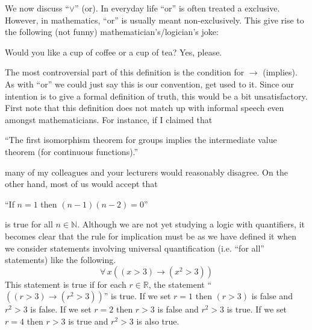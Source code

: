\documentclass[11pt]{article}
\newcommand{\R}{\mathbb{R}}
\newcommand{\N}{\mathbb{N}}
\begin{document}
We now discuss ``$\vee$'' (or). In everyday life ``or'' is often treated a exclusive. However, in mathematics, ``or'' is usually meant non-exclusively. This give rise to the following (not funny) mathematician's/logician's joke:

\begin{dialogue}
 Would you like a cup of coffee or a cup of tea?
 Yes, please.
\end{dialogue}

The most controversial part of this definition is the condition for $\rightarrow$ (implies).  As with ``or'' we could just say this is our convention, get used to it. Since our intention is to give a formal definition of truth, this would be a bit unsatisfactory. First note that this definition does not match up with informal speech even amongst mathematicians. For instance, if I claimed that
\begin{center}
``The first isomorphism theorem for groups implies the intermediate value theorem (for continuous functions).''
\end{center}
 many of my colleagues and your lecturers would reasonably disagree.  On the other hand, most of us would accept that
\begin{center}
``If $n=1$ then $(n-1)(n-2)=0$''
\end{center}
 is true for all $n\in\N$. Although we are not yet studying a logic with quantifiers, it becomes clear that the rule for implication must be as we have defined it when we consider statements involving universal quantification (i.e. ``for all'' statements) like the following.
\[\forall\, x ((x>3)\rightarrow (x^2>3))\]
This statement is true if for each $r\in \R$, the statement ``$((r>3)\rightarrow (r^2>3))$'' is true. If we set $r=1$ then $(r>3)$ is false and $r^2>3$ is false. If we set $r=2$ then $r>3$ is false and $r^2>3$ is true. If we set $r=4$ then $r>3$ is true and $r^2>3$ is also true.
\end{document}
